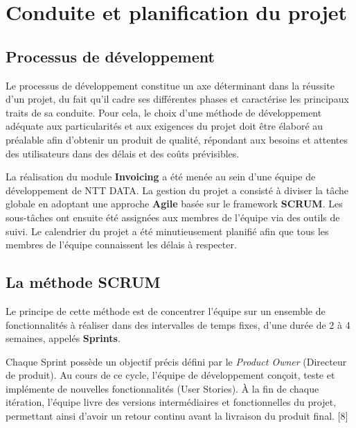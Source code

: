 \documentclass[12pt, a4paper, openany]{report}
\begin{document}
\section{Conduite et planification du projet}

\vspace{-0.5cm}
\subsection{Processus de développement}

\vspace{-0.3cm}
Le processus de développement constitue un axe déterminant dans la réussite d'un projet, du fait qu'il cadre ses différentes phases et caractérise les principaux traits de sa conduite. Pour cela, le choix d'une méthode de développement adéquate aux particularités et aux exigences du projet doit être élaboré au préalable afin d'obtenir un produit de qualité, répondant aux besoins et attentes des utilisateurs dans des délais et des coûts prévisibles.

La réalisation du module \textbf{Invoicing} a été menée au sein d'une équipe de développement de NTT DATA. La gestion du projet a consisté à diviser la tâche globale en adoptant une approche \textbf{Agile} basée sur le framework \textbf{SCRUM}. Les sous-tâches ont ensuite été assignées aux membres de l'équipe via des outils de suivi. Le calendrier du projet a été minutieusement planifié afin que tous les membres de l'équipe connaissent les délais à respecter.

\vspace{-0.4cm}

\subsection{La méthode SCRUM}

\vspace{-0.3cm}
Le principe de cette méthode est de concentrer l'équipe sur un ensemble de fonctionnalités à réaliser dans des intervalles de temps fixes, d'une durée de 2 à 4 semaines, appelés \textbf{Sprints}. 

Chaque Sprint possède un objectif précis défini par le \textit{Product Owner} (Directeur de produit). Au cours de ce cycle, l'équipe de développement conçoit, teste et implémente de nouvelles fonctionnalités (User Stories). À la fin de chaque itération, l'équipe livre des versions intermédiaires et fonctionnelles du projet, permettant ainsi d'avoir un retour continu avant la livraison du produit final. [8]
\end{document}
